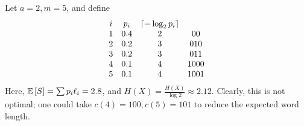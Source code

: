 \begin{example}
    Let \( a = 2, m = 5 \), and define
    \[ \begin{array}{cccc}
            i & p_i & \lceil-\log_2 p_i\rceil \\
            1 & 0.4 & 2 & 00 \\
            2 & 0.2 & 3 & 010 \\
            3 & 0.2 & 3 & 011 \\
            4 & 0.1 & 4 & 1000 \\
            5 & 0.1 & 4 & 1001
    \end{array} \]
    Here, \( \mathbb{E}\left[{S}\right] = \sum p_i \ell_i = 2.8 \), and \( H(X) = \frac{H(X)}{\log 2} \approx 2.12 \).
    Clearly, this is not optimal; one could take \( c(4) = 100, c(5) = 101 \) to reduce the expected word length.
\end{example}

